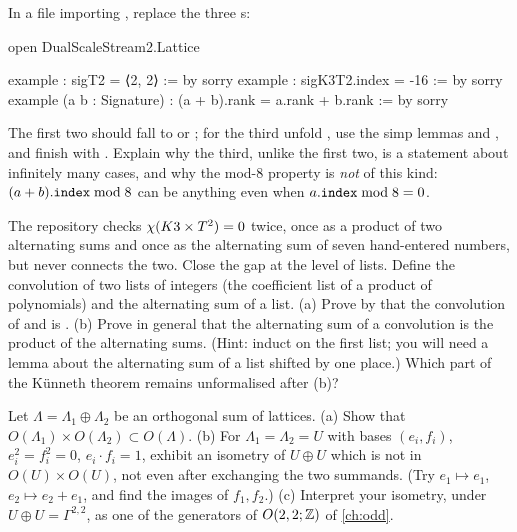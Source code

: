 \begin{exercise}
In a file importing , replace the three
s:
\begin{leancode}
open DualScaleStream2.Lattice

example : sigT2 = ⟨2, 2⟩ := by sorry
example : sigK3T2.index = -16 := by sorry
example (a b : Signature) : (a + b).rank = a.rank + b.rank := by sorry
\end{leancode}
The first two should fall to  or ; for the third unfold
, use the simp lemmas  and
, and finish with . Explain why the third, unlike the
first two, is a statement about infinitely many cases, and why the mod-$8$ property is
\emph{not} of this kind: $(a+b).\texttt{index}\bmod 8$ can be anything even when
$a.\texttt{index}\bmod 8=0$.
\end{exercise}

\begin{exercise}\label{exe:k3t2:leanconv}
The repository checks $\chi(K3\times T^2)=0$ twice, once as a product of two alternating sums and once
as the alternating sum of seven hand-entered numbers, but never connects the two. Close the
gap at the level of lists. Define the convolution of two lists of integers (the coefficient
list of a product of polynomials) and the alternating sum of a list. (a) Prove by
 that the convolution of \lean{[1,0,22,0,1]} and \lean{[1,2,1]} is
\lean{[1,2,23,44,23,2,1]}. (b) Prove in general that the alternating sum of a convolution is
the product of the alternating sums. (Hint: induct on the first list; you will need a lemma
about the alternating sum of a list shifted by one place.) Which part of the K\"unneth
theorem remains unformalised after (b)?
\end{exercise}

\begin{exercise}[$\star\star\star$]
Let $\Lambda=\Lambda_1\oplus\Lambda_2$ be an orthogonal sum of lattices. (a) Show that
$O(\Lambda_1)\times O(\Lambda_2)\subset O(\Lambda)$. (b) For $\Lambda_1=\Lambda_2=U$ with
bases $(e_i,f_i)$, $e_i^2=f_i^2=0$, $e_i\cdot f_i=1$, exhibit an isometry of $U\oplus U$
which is not in $O(U)\times O(U)$, not even after exchanging the two summands. (Try
$e_1\mapsto e_1$, $e_2\mapsto e_2+e_1$, and find the images of $f_1,f_2$.) (c) Interpret
your isometry, under $U\oplus U=\Gamma^{2,2}$, as one of the generators of $O(2,2;\mathbb{Z})$ of
\cref{ch:odd}.
\end{exercise}

